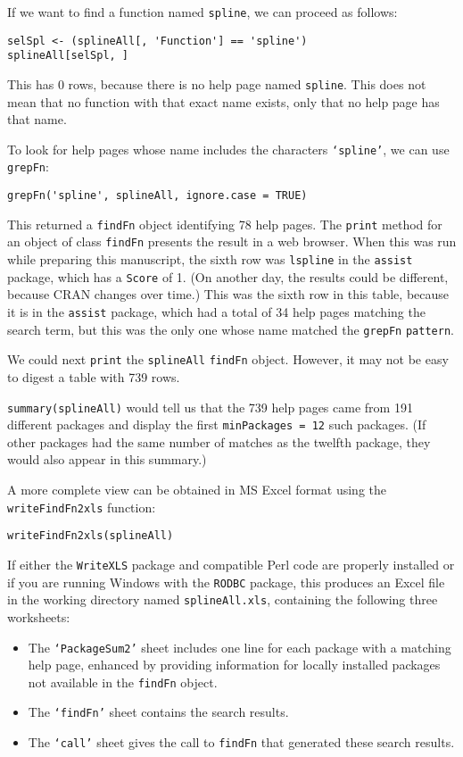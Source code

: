 If we want to find a function named {\tt spline}, we can
proceed as follows:
\begin{verbatim}
selSpl <- (splineAll[, 'Function'] == 'spline')
splineAll[selSpl, ]
\end{verbatim}
This has 0 rows, because there is no help page named
{\tt spline}.  This does not mean that no function
with that exact name exists, only that no help page
has that name.

To look for help pages whose name includes the characters
{\tt `spline'}, we can use {\tt grepFn}:
\begin{verbatim}
grepFn('spline', splineAll, ignore.case = TRUE)
\end{verbatim}
This returned a {\tt findFn} object identifying 78 help pages.
The {\tt print} method for an object of class {\tt findFn}
presents the result in a web browser.  When this was
run while preparing this manuscript, the sixth row was
{\tt lspline} in the
{\tt assist} package, which has a {\tt Score} of 1.
(On another day, the results could be different, because
CRAN changes over time.)  This was the sixth row in this
table, because it is in the
{\tt assist} package, which had a total of 34 help
pages matching the search term, but this was the only
one whose name matched the {\tt grepFn} {\tt pattern}.

We could next {\tt print} the {\tt splineAll} {\tt findFn}
object.  However, it may not be easy to digest a table
with 739 rows.

{\tt summary(splineAll)} would tell us that the 739 help pages
came from 191 different packages and display the first
{\tt minPackages = 12} such packages.
(If other packages had the same number of
matches as the twelfth package, they would also appear in this
summary.)

A more complete view can be obtained in MS Excel format
using the {\tt writeFindFn2xls} function:
\begin{verbatim}
writeFindFn2xls(splineAll)
\end{verbatim}
If either the {\tt WriteXLS} package and compatible Perl code
are properly installed or if you are running Windows with
the {\tt RODBC} package, this produces an Excel file in the
working directory named {\tt splineAll.xls}, containing the
following three worksheets:

\begin{itemize}
\item{The {\tt `PackageSum2'} sheet includes one line for each
package with a matching help page, enhanced by providing
information for locally installed packages 
not available in the {\tt findFn} object.}
\item{The {\tt `findFn'} sheet contains the search results.}
\item{The {\tt `call'} sheet gives the call to {\tt findFn}
that generated these search results.}
\end{itemize}

